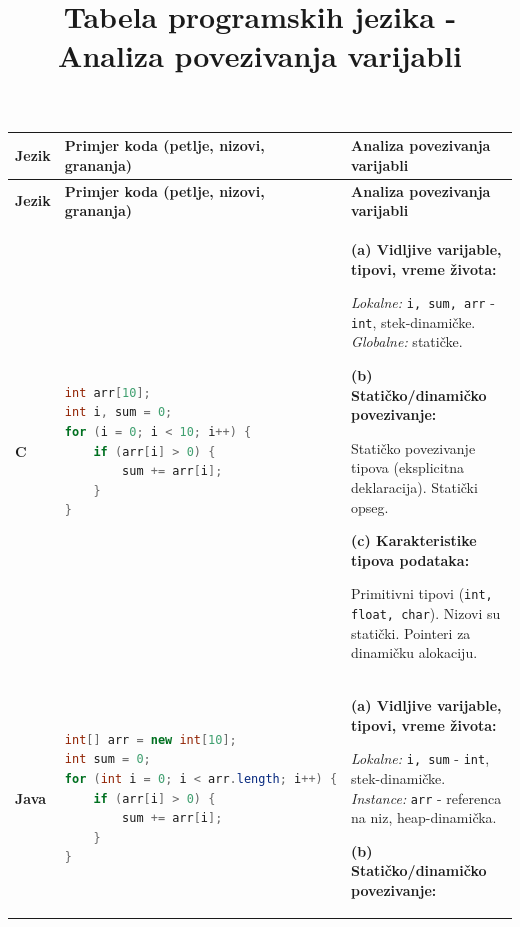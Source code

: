 \documentclass[12pt,a4paper]{article}
\title{Tabela programskih jezika - Analiza povezivanja varijabli}
\author{}
\date{}
\begin{document}
\maketitle

\begin{longtable}{|p{2cm}|p{5cm}|p{8cm}|}
\hline
\textbf{Jezik} & \textbf{Primjer koda (petlje, nizovi, grananja)} & 
\textbf{Analiza povezivanja varijabli} \\
\hline
\endfirsthead

\hline
\textbf{Jezik} & \textbf{Primjer koda (petlje, nizovi, grananja)} & 
\textbf{Analiza povezivanja varijabli} \\
\hline
\endhead

\hline
\endfoot

\hline
\endlastfoot

\textbf{C} & 
\begin{lstlisting}[language=C]
int arr[10];
int i, sum = 0;
for (i = 0; i < 10; i++) {
    if (arr[i] > 0) {
        sum += arr[i];
    }
}
\end{lstlisting} & 
\textbf{(a) Vidljive varijable, tipovi, vreme života:}

\textit{Lokalne:} \texttt{i, sum, arr} - \texttt{int}, stek-dinamičke. \textit{Globalne:} statičke.

\vspace{0.2cm}
\textbf{(b) Statičko/dinamičko povezivanje:}

Statičko povezivanje tipova (eksplicitna deklaracija). Statički opseg.

\vspace{0.2cm}
\textbf{(c) Karakteristike tipova podataka:}

Primitivni tipovi (\texttt{int, float, char}). Nizovi su statički. Pointeri za dinamičku alokaciju. \\
\hline

\textbf{Java} & 
\begin{lstlisting}[language=Java]
int[] arr = new int[10];
int sum = 0;
for (int i = 0; i < arr.length; i++) {
    if (arr[i] > 0) {
        sum += arr[i];
    }
}
\end{lstlisting} & 
\textbf{(a) Vidljive varijable, tipovi, vreme života:}

\textit{Lokalne:} \texttt{i, sum} - \texttt{int}, stek-dinamičke. \textit{Instance:} \texttt{arr} - referenca na niz, heap-dinamička.

\vspace{0.2cm}
\textbf{(b) Statičko/dinamičko povezivanje:}


\end{longtable}
\end{document}
